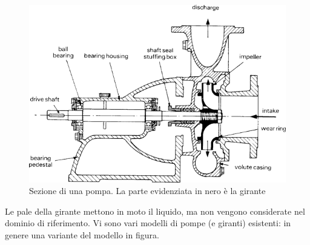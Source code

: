 \documentclass{tufte-handout}
\begin{document}
\begin{figure}%
  \includegraphics[width=\linewidth]{pompa.png}
  \caption{Sezione di una pompa. La parte evidenziata in nero è la girante}
  \label{fig:pompa}
\end{figure}

Le pale della girante mettono in moto il liquido, ma non vengono considerate nel dominio
di riferimento. Vi sono vari modelli di pompe (e giranti) esistenti: in genere una variante 
del modello in figura.
\end{document}
